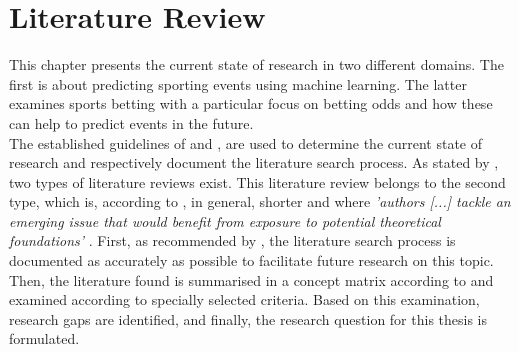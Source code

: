 \chapter{Literature Review}
\label{chap:literature_review}

This chapter presents the current state of research in two different domains. The first is about predicting sporting events using machine learning. The latter examines sports betting with a particular focus on betting odds and how these can help to predict events in the future. \\
\indent The established guidelines of \citet{vom_brocke_standing_2015} and \citet{webster_guest_2002}, are used to determine the current state of research and respectively document the literature search process. As stated by \citet{webster_guest_2002}, two types of literature reviews exist. This literature review belongs to the second type, which is, according to \citeauthor{webster_guest_2002}, in general, shorter and where \emph{'authors [...] tackle an emerging issue that would benefit from exposure to potential theoretical foundations'} \parencite[, p. 14]{webster_guest_2002}. First, as recommended by \citet{vom_brocke_standing_2015}, the literature search process is documented as accurately as possible to facilitate future research on this topic. Then, the literature found is summarised in a concept matrix according to \citet{webster_guest_2002} and examined according to specially selected criteria. Based on this examination, research gaps are identified, and finally, the research question for this thesis is formulated.

